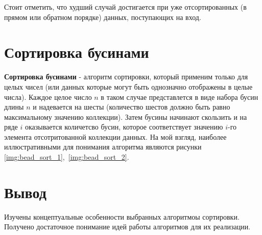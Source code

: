 Стоит отметить, что худший случай достигается при уже отсортированных (в прямом
или обратном порядке) данных, поступающих на вход.

\section{Сортировка бусинами}

\textbf{Сортировка бусинами}\cite{select} - алгоритм сортировки, который
применим только для целых чисел (или данных которые могут быть однозначно
отображены в целые числа). Каждое целое число $n$ в таком случае представлется в
виде набора бусин длины $n$ и надевается на шесты (количество шестов должно
быть равно максимальному значению коллекции). Затем бусины начинают скользить
и на ряде $i$ оказывается количетсво бусин, которое соответствует
значению $i$-го элемента отсотритованной коллекции данных. На мой взгляд,
наиболее иллюстративными для понимания алгоритма являются рисунки
\ref{img:bead_sort_1},~\ref{img:bead_sort_2}.



\section*{Вывод}

Изучены концептуальные особенности выбранных алгоритмоы сортировки. Получено
достаточное понимание идей работы алгоритмов для их реализации.
